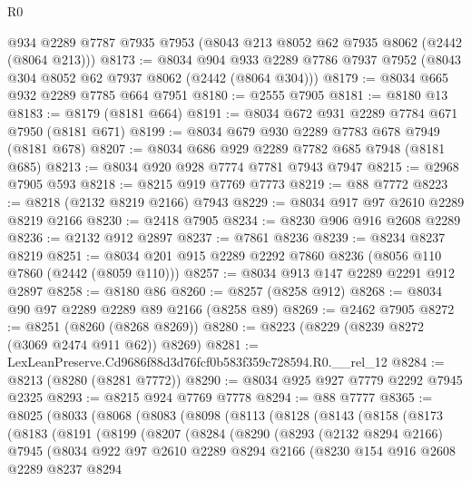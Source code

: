 \begin{lexlean}{R0}
\begin{coremodule}
    @934
    @2289
    @7787
    @7935
    @7953
    (@8043 @213 @8052 @62 @7935 @8062 (@2442 (@8064 @213)))
@8173 := @8034
    @904
    @933
    @2289
    @7786
    @7937
    @7952
    (@8043 @304 @8052 @62 @7937 @8062 (@2442 (@8064 @304)))
@8179 := @8034 @665 @932 @2289 @7785 @664 @7951
@8180 := @2555 @7905
@8181 := @8180 @13
@8183 := @8179 (@8181 @664)
@8191 := @8034 @672 @931 @2289 @7784 @671 @7950 (@8181 @671)
@8199 := @8034 @679 @930 @2289 @7783 @678 @7949 (@8181 @678)
@8207 := @8034 @686 @929 @2289 @7782 @685 @7948 (@8181 @685)
@8213 := @8034 @920 @928 @7774 @7781 @7943 @7947
@8215 := @2968 @7905 @593
@8218 := @8215 @919 @7769 @7773
@8219 := @88 @7772
@8223 := @8218 (@2132 @8219 @2166) @7943
@8229 := @8034 @917 @97 @2610 @2289 @8219 @2166
@8230 := @2418 @7905
@8234 := @8230 @906 @916 @2608 @2289
@8236 := @2132 @912 @2897
@8237 := @7861 @8236
@8239 := @8234 @8237 @8219
@8251 := @8034 @201 @915 @2289 @2292 @7860 @8236 (@8056 @110 @7860 (@2442 (@8059 @110)))
@8257 := @8034 @913 @147 @2289 @2291 @912 @2897
@8258 := @8180 @86
@8260 := @8257 (@8258 @912)
@8268 := @8034 @90 @97 @2289 @2289 @89 @2166 (@8258 @89)
@8269 := @2462 @7905
@8272 := @8251 (@8260 (@8268 @8269))
@8280 := @8223 (@8229 (@8239 @8272 (@3069 @2474 @911 @62)) @8269)
@8281 := LexLeanPreserve.Cd9686f88d3d76fcf0b583f359c728594.R0.__rel_12
@8284 := @8213 (@8280 (@8281 @7772))
@8290 := @8034 @925 @927 @7779 @2292 @7945 @2325
@8293 := @8215 @924 @7769 @7778
@8294 := @88 @7777
@8365 := @8025
    (@8033
      (@8068
        (@8083
          (@8098
            (@8113
              (@8128
                (@8143
                  (@8158
                    (@8173
                      (@8183
                        (@8191
                          (@8199
                            (@8207
                              (@8284
                                (@8290
                                  (@8293
                                    (@2132 @8294 @2166)
                                    @7945
                                    (@8034
                                      @922
                                      @97
                                      @2610
                                      @2289
                                      @8294
                                      @2166
                                      (@8230
                                        @154
                                        @916
                                        @2608
                                        @2289
                                        @8237
                                        @8294

\end{coremodule}
\end{lexlean}

